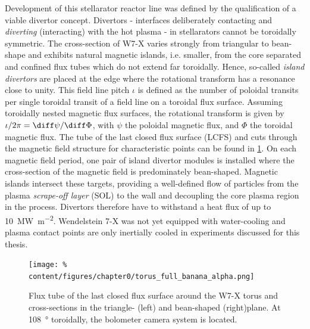         Development of this stellarator reactor line was defined by the qualification of a viable divertor concept. Divertors - interfaces deliberately contacting and \textit{diverting} (interacting) with the hot plasma - in stellarators cannot be toroidally symmetric. The cross-section of W7-X varies strongly from triangular to bean-shape and exhibits natural magnetic islands, i.e. smaller, from the core separated and confined flux tubes which do not extend far toroidally. Hence, so-called \textit{island divertors} are placed at the edge where the rotational transform has a resonance close to unity. This field line pitch $\iota$ is defined as the number of poloidal transits per single toroidal transit of a field line on a toroidal flux surface. Assuming toroidally nested magnetic flux surfaces, the rotational transform is given by $\iota/2\pi=\diff\psi/\diff\Phi$, with $\psi$ the poloidal magnetic flux, and $\Phi$ the toroidal magnetic flux. The tube of the last closed flux surface (LCFS) and cuts through the magnetic field structure for characteristic points can be found in \cref{fig:trianglebeanFS}. On each magnetic field period, one pair of island divertor modules is installed where the cross-section of the magnetic field is predominately bean-shaped. Magnetic islands intersect these targets, providing a well-defined flow of particles from the plasma \textit{scrape-off layer} (SOL) to the wall and decoupling the core plasma region in the process. Divertors therefore have to withstand a heat flux of up to \SI{10}{\mega\watt\per\square\meter}. Wendelstein 7-X was not yet equipped with water-cooling and plasma contact points are only inertially cooled in experiments discussed for this thesis\cite{Geiger2015,Beidler1990}.%
%
        \begin{figure}%
            \centering%
            \texttt{[image: \%
                content/figures/chapter0/torus\_full\_banana\_alpha.png]}%
            \caption{Flux tube of the last closed flux surface around the W7-X torus and cross-sections in the triangle- (left) and bean-shaped (right)plane. At \SI{108}{\degree} toroidally, the bolometer camera system is located.}\label{fig:trianglebeanFS}%
        \end{figure}%
%
